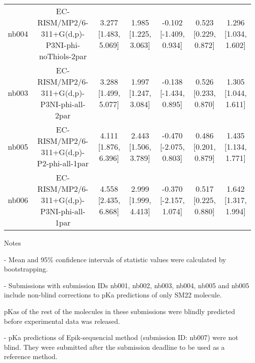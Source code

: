 \documentclass{article}
\begin{document}
\begin{center}
\begin{longtable}{|ccccccc|}
 nb004 &    EC-RISM/MP2/6-311+G(d,p)-P3NI-phi-noThiols-2par &  3.277 [1.483, 5.069] &  1.985 [1.225, 3.063] &   -0.102 [-1.409, 0.934] &  0.523 [0.229, 0.872] &   1.296 [1.034, 1.602] \\
 nb003 &         EC-RISM/MP2/6-311+G(d,p)-P3NI-phi-all-2par &  3.288 [1.499, 5.077] &  1.997 [1.247, 3.084] &   -0.138 [-1.434, 0.895] &  0.526 [0.233, 0.870] &   1.305 [1.044, 1.611] \\
 nb005 &           EC-RISM/MP2/6-311+G(d,p)-P2-phi-all-1par &  4.111 [1.876, 6.396] &  2.443 [1.506, 3.789] &   -0.470 [-2.075, 0.803] &  0.486 [0.201, 0.879] &   1.435 [1.134, 1.771] \\
 nb006 &         EC-RISM/MP2/6-311+G(d,p)-P3NI-phi-all-1par &  4.558 [2.435, 6.868] &  2.999 [1.999, 4.413] &   -0.370 [-2.157, 1.074] &  0.517 [0.225, 0.880] &   1.642 [1.317, 1.994] \\
\end{longtable}
\end{center}

Notes

- Mean and 95\% confidence intervals of statistic values were calculated by bootstrapping.

- Submissions with submission IDs nb001, nb002, nb003, nb004, nb005 and nb005 include non-blind corrections to pKa predictions of only SM22 molecule.

pKas of the rest of the molecules in these submissions were blindly predicted before experimental data was released.

- pKa predictions of Epik-sequencial method (submission ID: nb007) were not blind. They were submitted after the submission deadline to be used as a reference method.
\end{document}
